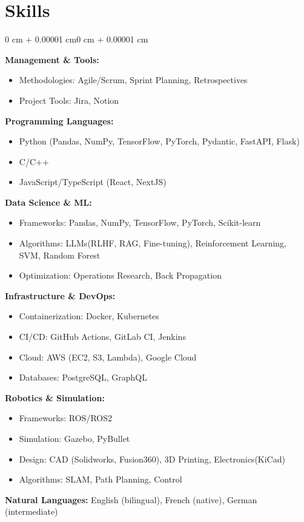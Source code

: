 \documentclass[10pt, letterpaper]{article}
\newenvironment{onecolentry}{
    \begin{adjustwidth}{0 cm + 0.00001 cm}{0 cm + 0.00001 cm}
}{
    \end{adjustwidth}
}
\begin{document}
    \section{Skills}
    \begin{onecolentry}
        \textbf{Management \& Tools:}
        \begin{itemize}[noitemsep,topsep=0pt]
            \item Methodologies: Agile/Scrum, Sprint Planning, Retrospectives
            \item Project Tools: Jira, Notion
        \end{itemize}

        \textbf{Programming Languages:} 
        \begin{itemize}[noitemsep,topsep=0pt]
            \item Python (Pandas, NumPy, TensorFlow, PyTorch, Pydantic, FastAPI, Flask)
            \item C/C++
            \item JavaScript/TypeScript (React, NextJS)
        \end{itemize}
        
        \textbf{Data Science \& ML:} 
        \begin{itemize}[noitemsep,topsep=0pt]
            \item Frameworks: Pandas, NumPy, TensorFlow, PyTorch, Scikit-learn
            \item Algorithms: LLMs(RLHF, RAG, Fine-tuning), Reinforcement Learning, SVM, Random Forest
            \item Optimization: Operations Research, Back Propagation
        \end{itemize}
        
        \textbf{Infrastructure \& DevOps:}
        \begin{itemize}[noitemsep,topsep=0pt]
            \item Containerization: Docker, Kubernetes
            \item CI/CD: GitHub Actions, GitLab CI, Jenkins
            \item Cloud: AWS (EC2, S3, Lambda), Google Cloud
            \item Databases: PostgreSQL, GraphQL
        \end{itemize}
        
        \textbf{Robotics \& Simulation:}
        \begin{itemize}[noitemsep,topsep=0pt]
            \item Frameworks: ROS/ROS2
            \item Simulation: Gazebo, PyBullet
            \item Design: CAD (Solidworks, Fusion360), 3D Printing, Electronics(KiCad)
            \item Algorithms: SLAM, Path Planning, Control
        \end{itemize}
        
        \textbf{Natural Languages:} English (bilingual), French (native), German (intermediate)
    \end{onecolentry}
\end{document}
